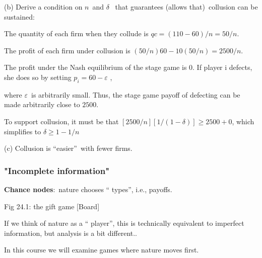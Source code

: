 \documentclass[handout]{beamer}
\begin{document}
\begin{frame}%

\pause%
{\footnotesize (b) Derive a condition on }$n${\footnotesize \ and }$\delta $%
{\footnotesize \ that guarantees (allows that)\ collusion can be
sustained:\bigskip }

{\footnotesize The quantity of each firm when they collude is }$%
qc=(110-60)/n=50/n${\footnotesize .}

{\footnotesize The profit of each firm under collusion is }$%
(50/n)60-10(50/n)=2500/n.${\footnotesize \bigskip }

\pause%
{\footnotesize The profit under the Nash equilibrium of the stage game is 0.
If player i defects, she does so by setting }$p_{i}=60-\varepsilon $%
{\footnotesize ,}

{\footnotesize where }$\varepsilon ${\footnotesize \ is arbitrarily small.
Thus, the stage game payoff of defecting can be made arbitrarily close to }$%
2500.$

{\footnotesize \bigskip To support collusion, it must be that }$%
[2500/n][1/(1-\delta )]\geq 2500+0${\footnotesize , which simplifies to }$%
\delta \geq 1-1/n$

{\footnotesize (c) Collusion is \textquotedblleft easier\textquotedblright\
with fewer firms.}

\end{frame}%

\begin{frame}%

\frametitle{\textbf{"Incomplete information"}}

\textbf{Chance nodes}:\ nature chooses \textquotedblleft
types\textquotedblright , i.e., payoffs.

Fig 24.1: the gift game [Board]

\bigskip 

{\footnotesize If we think of nature as a \textquotedblleft
player\textquotedblright , this is technically equivalent to imperfect
information, but analysis is a bit different..}

{\footnotesize In this course we will examine games where nature moves first.%
}

\end{frame}%
\end{document}
